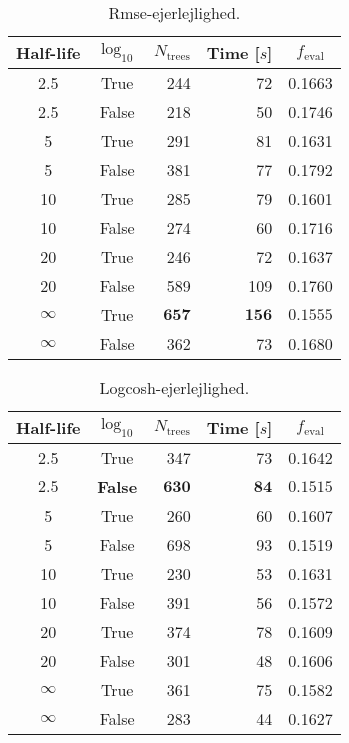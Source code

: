 
 \begin{table}[]
  \begin{tabular}{@{}ccrrc@{}}
    Half-life & $\log_{10}$ & $N_\mathrm{trees}$ & Time [$s$] & $f_\mathrm{eval}$ \\
    \midrule
    \num{2.5} & True & \num{244} & \num{72} & \num{0.1663} \\
    \num{2.5} & False & \num{218} & \num{50} & \num{0.1746} \\
    \num{5} & True & \num{291} & \num{81} & \num{0.1631} \\
    \num{5} & False & \num{381} & \num{77} & \num{0.1792} \\
    \num{10} & True & \num{285} & \num{79} & \num{0.1601} \\
    \num{10} & False & \num{274} & \num{60} & \num{0.1716} \\
    \num{20} & True & \num{246} & \num{72} & \num{0.1637} \\
    \num{20} & False & \num{589} & \num{109} & \num{0.1760} \\
    $\bm{\infty}$ & True & $\mathbf{657}$ & $\mathbf{156}$ & $\mathbf{0.1555}$ \\
    $\infty$ & False & \num{362} & \num{73} & \num{0.1680} \\
  \end{tabular}
  \caption{\label{tab:h:HPO_initial_Rmse-ejerlejlighed}Rmse-ejerlejlighed.}
\end{table}


\begin{table}[]
  \begin{tabular}{@{}ccrrc@{}}
    Half-life & $\log_{10}$ & $N_\mathrm{trees}$ & Time [$s$] & $f_\mathrm{eval}$ \\
    \midrule
    \num{2.5} & True & \num{347} & \num{73} & \num{0.1642} \\
    $\mathbf{2.5}$ & \textbf{False} & $\mathbf{630}$ & $\mathbf{84}$ & $\mathbf{0.1515}$ \\
    \num{5} & True & \num{260} & \num{60} & \num{0.1607} \\
    \num{5} & False & \num{698} & \num{93} & \num{0.1519} \\
    \num{10} & True & \num{230} & \num{53} & \num{0.1631} \\
    \num{10} & False & \num{391} & \num{56} & \num{0.1572} \\
    \num{20} & True & \num{374} & \num{78} & \num{0.1609} \\
    \num{20} & False & \num{301} & \num{48} & \num{0.1606} \\
    $\infty$ & True & \num{361} & \num{75} & \num{0.1582} \\
    $\infty$ & False & \num{283} & \num{44} & \num{0.1627} \\
  \end{tabular}
  \caption{\label{tab:h:HPO_initial_Logcosh-ejerlejlighed}Logcosh-ejerlejlighed.}
\end{table}

